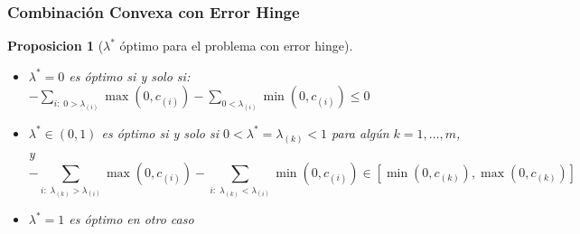 \documentclass[aspectratio=43]{beamer}
\newtheorem{proposition}[theorem]{Proposicion}
\newcommand{\mymax}[1]{\max\left(#1\right)}
\newcommand{\mymin}[1]{\min\left(#1\right)}
\newcommand{\npertask}{m}
\begin{document}
\begin{frame}
      \frametitle{Combinación Convexa con Error Hinge}
      \begin{proposition}[$\lambda^*$ óptimo para el problema con error hinge]\label{prop:hinge_neurocom2020}
            \begin{itemize}
                  \item $\lambda^*=0$ es óptimo si y solo si: $-\sum_{i:\; 0 > \lambda_{(i)}} \mymax{0, c_{(i)}} - \sum_{0 < \lambda_{(i)}} \mymin{0, c_{(i)}} \leq 0 $
                  \item $\lambda^* \in (0,1)$ es óptimo si y solo si $0 < \lambda^* = \lambda_{(k)} < 1$ para algún $k=1, \dotsc, \npertask$, y
                  \begin{equation}
                        \nonumber%
                        -\sum_{i:\; \lambda_{(k)} > \lambda_{(i)}} \mymax{0, c_{(i)}} - \sum_{i:\; \lambda_{(k)} <\lambda_{(i)}} \mymin{0, c_{(i)}} \in \left[\mymin{0, c_{(k)}}, \mymax{0, c_{(k)}} \right] 
                  \end{equation}
                  \item $\lambda^*=1$ es óptimo en otro caso
            \end{itemize}
        \end{proposition}
\end{frame}
\end{document}
